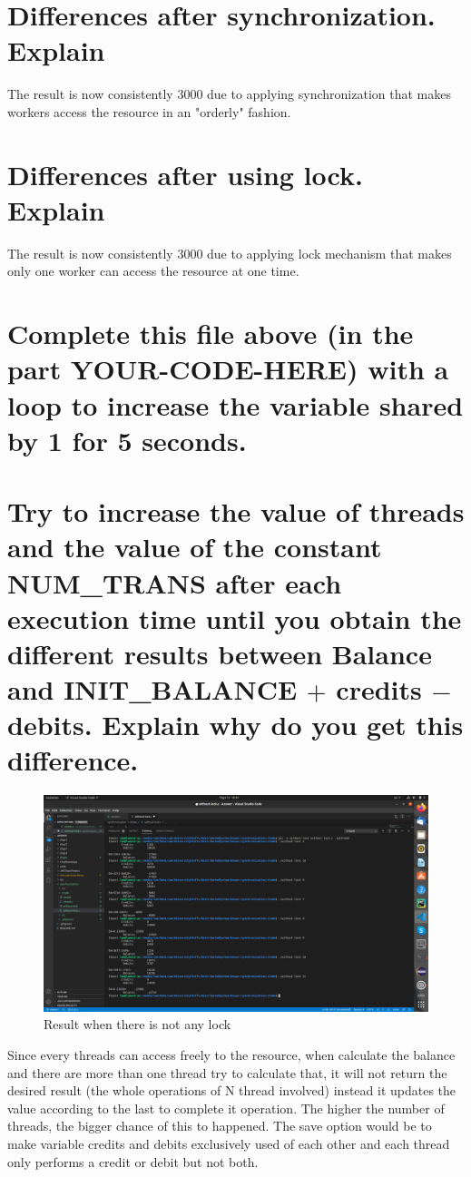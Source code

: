 \documentclass[11pt,a4paper]{article}
\begin{document}
\section{Differences after synchronization. Explain}
The result is now consistently 3000 due to applying synchronization that makes workers access the resource in an "orderly" fashion.
\section{Differences after using lock. Explain}
The result is now consistently 3000 due to applying lock mechanism that makes only one worker can access the resource at one time.
\section{Complete this file above (in the part YOUR-CODE-HERE) with a loop to increase the variable shared by 1 for 5 seconds.}

\section{Try to increase the value of threads and the value of the constant NUM\_TRANS after each execution time until you obtain the different results between Balance and INIT\_BALANCE $+$ credits $-$ debits. Explain why do you get this difference.}
\begin{figure}[h!]
	\centering
  	\includegraphics[width=\linewidth]{without-lock.png}
  	\caption{Result when there is not any lock}
  	\label{fig:wolock}
\end{figure}
Since every threads can access freely to the resource, when calculate the balance and there are more than one thread try to calculate that, it will not return the desired result (the whole operations of N thread involved) instead it updates the value according to the last to complete it operation. The higher the number of threads, the bigger chance of this to happened. The save option would be to make variable credits and debits exclusively used of each other and each thread only performs a credit or debit but not both.
\end{document}
